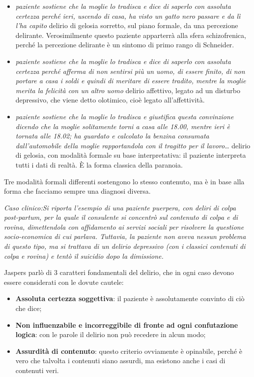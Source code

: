 \begin{itemize}
\begin{itemize}
\item
  \emph{paziente sostiene che la moglie lo tradisca e dice di saperlo
  con assoluta certezza perché ieri, uscendo di casa, ha visto un gatto
  nero passare e da lì l'ha capito} delirio di gelosia sorretto, sul
  piano formale, da una percezione delirante. Verosimilmente questo
  paziente apparterrà alla sfera schizofrenica, perché la percezione
  delirante è un sintomo di primo rango di Schneider.
\item
  \emph{paziente sostiene che la moglie lo tradisca e dice di saperlo
  con assoluta certezza perché afferma di non sentirsi più un uomo, di
  essere finito, di non portare a casa i soldi e quindi di meritare di
  essere tradito, mentre la moglie merita la felicità con un altro uomo}
  delirio affettivo, legato ad un disturbo depressivo, che viene detto
  olotimico, cioè legato all'affettività.
\item
  \emph{paziente sostiene che la moglie lo tradisca e giustifica questa
  convinzione dicendo che la moglie solitamente torni a casa alle 18.00,
  mentre ieri è tornata alle 18.02; ha guardato e calcolato la benzina
  consumata dall'automobile della moglie rapportandola con il tragitto
  per il lavoro}\ldots{} delirio di gelosia, con modalità formale su
  base interpretativa: il paziente interpreta tutti i dati di realtà. È
  la forma classica della paranoia.
\end{itemize}

Tre modalità formali differenti sostengono lo stesso contenuto, ma è in
base alla forma che facciamo sempre una diagnosi diversa.

\emph{Caso clinico:Si riporta l'esempio di una} \emph{paziente puerpera,
con deliri di colpa post-partum, per la quale il consulente si concentrò
sul contenuto di colpa e di rovina, dimettendola con affidamento ai
servizi sociali per risolvere la questione socio-economica di cui
parlava. Tuttavia, la paziente non aveva nessun problema di questo tipo,
ma si trattava di un delirio depressivo (con i classici contenuti di
colpa e rovina) e tentò il suicidio dopo la dimissione. }

Jaspers parlò di 3 caratteri fondamentali del delirio, che in ogni caso
devono essere considerati con le dovute cautele:

\begin{itemize}
\item
  \textbf{Assoluta certezza soggettiva}: il paziente è assolutamente
  convinto di ciò che dice;
\item
  \textbf{Non influenzabile e incorreggibile di fronte ad ogni
  confutazione logica}: con le parole il delirio non può recedere in
  alcun modo;
\item
  \textbf{Assurdità di contenuto}: questo criterio ovviamente è
  opinabile, perché è vero che talvolta i contenuti siano assurdi, ma
  esistono anche i casi di contenuti veri.
\end{itemize}


\end{itemize}
